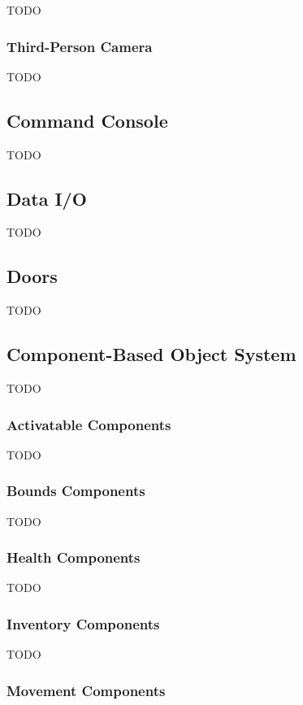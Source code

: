 TODO

\subsubsection{Third-Person Camera}

TODO

\subsection{Command Console}

TODO

\subsection{Data I/O}

TODO

\subsection{Doors}

TODO

\subsection{Component-Based Object System}

TODO

\subsubsection{Activatable Components}

TODO

\subsubsection{Bounds Components}

TODO

\subsubsection{Health Components}

TODO

\subsubsection{Inventory Components}

TODO

\subsubsection{Movement Components}

